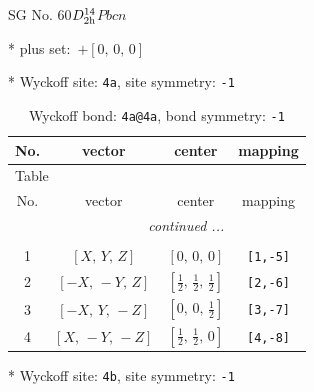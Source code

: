 \documentclass[fleqn,8pt]{jsarticle}
\begin{document}
\setcounter{MaxMatrixCols}{32}

\renewcommand{\tablename}{Table~}
\renewcommand{\figurename}{Figure~}
\begin{center}
\LARGE
SG No. 60\quad$D_{\rm 2h}^{14}$\quad$Pbcn$\quad[ orthorhombic ]
\end{center}

* plus set:\,\,\,$+\left[ 0,\, 0,\, 0 \right]$


* Wyckoff site: {\tt 4a}, site symmetry: {\tt -1}
\renewcommand{\arraystretch}{1.2}
\begin{longtable}{cccc}
\caption{Wyckoff bond: {\tt 4a@4a}, bond symmetry: {\tt -1}}
 \\
 \hline \hline
No. & vector & center & mapping \\ \hline \endfirsthead

\multicolumn{3}{l}{\tablename\ \thetable{}} \\
 \hline \hline
No. & vector & center & mapping \\ \hline \endhead

 \hline \hline
\multicolumn{3}{r}{\footnotesize\it continued ...} \\ \endfoot

 \hline \hline
\multicolumn{3}{r}{} \\ \endlastfoot

1 & $\left[ X,\, Y,\, Z \right]$ & $\left[ 0,\, 0,\, 0 \right]$ & {\tt [1,-5]} \\ \hline
2 & $\left[ - X,\, - Y,\, Z \right]$ & $\left[ \frac{1}{2},\, \frac{1}{2},\, \frac{1}{2} \right]$ & {\tt [2,-6]} \\ \hline
3 & $\left[ - X,\, Y,\, - Z \right]$ & $\left[ 0,\, 0,\, \frac{1}{2} \right]$ & {\tt [3,-7]} \\ \hline
4 & $\left[ X,\, - Y,\, - Z \right]$ & $\left[ \frac{1}{2},\, \frac{1}{2},\, 0 \right]$ & {\tt [4,-8]} \\
\end{longtable}
* Wyckoff site: {\tt 4b}, site symmetry: {\tt -1}
\renewcommand{\arraystretch}{1.2}
\end{document}
